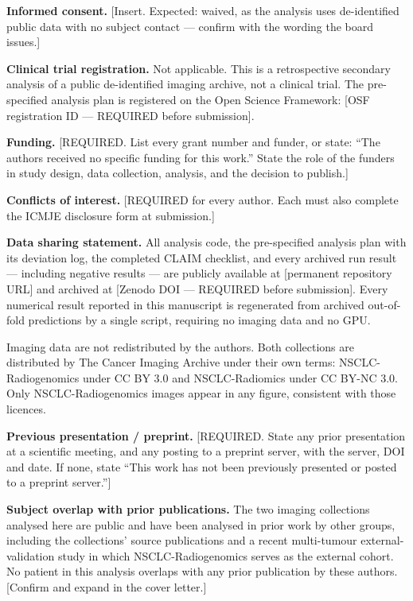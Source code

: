 \documentclass[11pt]{article}
\begin{document}
\bigskip
\noindent\textbf{Informed consent.}
[Insert. Expected: waived, as the analysis uses de-identified public data with no
subject contact --- confirm with the wording the board issues.]

\bigskip
\noindent\textbf{Clinical trial registration.}
Not applicable. This is a retrospective secondary analysis of a public
de-identified imaging archive, not a clinical trial. The pre-specified analysis
plan is registered on the Open Science Framework: [OSF registration ID ---
REQUIRED before submission].

\bigskip
\noindent\textbf{Funding.}
[REQUIRED. List every grant number and funder, or state: ``The authors received
no specific funding for this work.'' State the role of the funders in study
design, data collection, analysis, and the decision to publish.]

\bigskip
\noindent\textbf{Conflicts of interest.}
[REQUIRED for every author. Each must also complete the ICMJE disclosure form at
submission.]

\bigskip
\noindent\textbf{Data sharing statement.}
All analysis code, the pre-specified analysis plan with its deviation log, the
completed CLAIM checklist, and every archived run result --- including negative
results --- are publicly available at [permanent repository URL] and archived at
[Zenodo DOI --- REQUIRED before submission]. Every numerical result reported in
this manuscript is regenerated from archived out-of-fold predictions by a single
script, requiring no imaging data and no GPU.

Imaging data are not redistributed by the authors. Both collections are
distributed by The Cancer Imaging Archive under their own terms:
NSCLC-Radiogenomics under CC BY 3.0 and NSCLC-Radiomics under CC BY-NC 3.0. Only
NSCLC-Radiogenomics images appear in any figure, consistent with those licences.

\bigskip
\noindent\textbf{Previous presentation / preprint.}
[REQUIRED. State any prior presentation at a scientific meeting, and any posting
to a preprint server, with the server, DOI and date. If none, state ``This work
has not been previously presented or posted to a preprint server.'']

\bigskip
\noindent\textbf{Subject overlap with prior publications.}
The two imaging collections analysed here are public and have been analysed in
prior work by other groups, including the collections' source publications and a
recent multi-tumour external-validation study in which NSCLC-Radiogenomics serves
as the external cohort. No patient in this analysis overlaps with any prior
publication by these authors. [Confirm and expand in the cover letter.]
\end{document}
